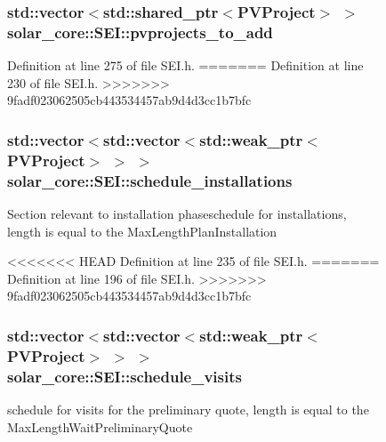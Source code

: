 \begin{figure}[H]
\begin{center}
\hypertarget{classsolar__core_1_1_s_e_i_a99fe003b8fd35b6ef44dec39ed374ffe}{}
\subsubsection[{pvprojects\+\_\+to\+\_\+add}]{\setlength{\rightskip}{0pt plus 5cm}std\+::vector$<$std\+::shared\+\_\+ptr$<${\bf P\+V\+Project}$>$ $>$ solar\+\_\+core\+::\+S\+E\+I\+::pvprojects\+\_\+to\+\_\+add\hspace{0.3cm}{\ttfamily [protected]}}\label{classsolar__core_1_1_s_e_i_a99fe003b8fd35b6ef44dec39ed374ffe}


Definition at line 275 of file S\+E\+I.\+h.
=======
Definition at line 230 of file S\+E\+I.\+h.
>>>>>>> 9fadf023062505cb443534457ab9d4d3cc1b7bfc

\hypertarget{classsolar__core_1_1_s_e_i_aacda4fae2c17d58672b60eba9c8cdc63}{}
\subsubsection[{schedule\+\_\+installations}]{\setlength{\rightskip}{0pt plus 5cm}std\+::vector$<$std\+::vector$<$std\+::weak\+\_\+ptr$<${\bf P\+V\+Project}$>$ $>$ $>$ solar\+\_\+core\+::\+S\+E\+I\+::schedule\+\_\+installations\hspace{0.3cm}{\ttfamily [protected]}}\label{classsolar__core_1_1_s_e_i_aacda4fae2c17d58672b60eba9c8cdc63}
Section relevant to installation phaseschedule for installations, length is equal to the Max\+Length\+Plan\+Installation 

<<<<<<< HEAD
Definition at line 235 of file S\+E\+I.\+h.
=======
Definition at line 196 of file S\+E\+I.\+h.
>>>>>>> 9fadf023062505cb443534457ab9d4d3cc1b7bfc

\hypertarget{classsolar__core_1_1_s_e_i_a8729d1aaf89da5d7d8b52761b65c881c}{}
\subsubsection[{schedule\+\_\+visits}]{\setlength{\rightskip}{0pt plus 5cm}std\+::vector$<$std\+::vector$<$std\+::weak\+\_\+ptr$<${\bf P\+V\+Project}$>$ $>$ $>$ solar\+\_\+core\+::\+S\+E\+I\+::schedule\+\_\+visits\hspace{0.3cm}{\ttfamily [protected]}}\label{classsolar__core_1_1_s_e_i_a8729d1aaf89da5d7d8b52761b65c881c}
schedule for visits for the preliminary quote, length is equal to the Max\+Length\+Wait\+Preliminary\+Quote 


\end{center}
\end{figure}
